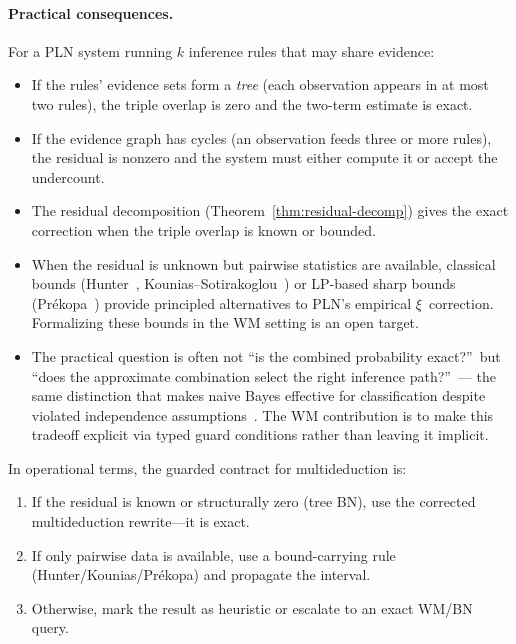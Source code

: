\documentclass[11pt,openany]{report}
\begin{document}
\paragraph{Practical consequences.}
For a PLN system running $k$ inference rules that may share evidence:
\begin{itemize}
\item If the rules' evidence sets form a \emph{tree} (each
  observation appears in at most two rules), the triple overlap is
  zero and the two-term estimate is exact.
\item If the evidence graph has cycles (an observation feeds three or
  more rules), the residual is nonzero and the system must either
  compute it or accept the undercount.
\item The residual decomposition
  (Theorem~\ref{thm:residual-decomp}) gives the exact correction
  when the triple overlap is known or bounded.
\item When the residual is unknown but pairwise statistics are
  available, classical bounds (Hunter~\cite{Hunter1976},
  Kounias--Sotirakoglou~\cite{KouniasSotirakoglou1989}) or
  LP-based sharp bounds (Pr\'ekopa~\cite{Prekopa1988}) provide
  principled alternatives to PLN's empirical $\xi$~correction.
  Formalizing these bounds in the WM setting is an open target.
\item The practical question is often not ``is the combined
  probability exact?''\ but ``does the approximate combination
  select the right inference path?''\ --- the same distinction
  that makes naive Bayes effective for classification despite
  violated independence
  assumptions~\cite{DomingosPazzani1997, Zhang2004NaiveBayes}.
  The WM contribution is to make this tradeoff explicit
  via typed guard conditions rather than leaving it implicit.
\end{itemize}

\noindent
In operational terms, the guarded contract for multideduction is:
\begin{enumerate}
\item If the residual is known or structurally zero (tree BN),
  use the corrected multideduction rewrite---it is exact.
\item If only pairwise data is available, use a bound-carrying
  rule (Hunter/Kounias/Pr\'ekopa) and propagate the interval.
\item Otherwise, mark the result as heuristic or escalate to
  an exact WM/BN query.
\end{enumerate}
\end{document}
